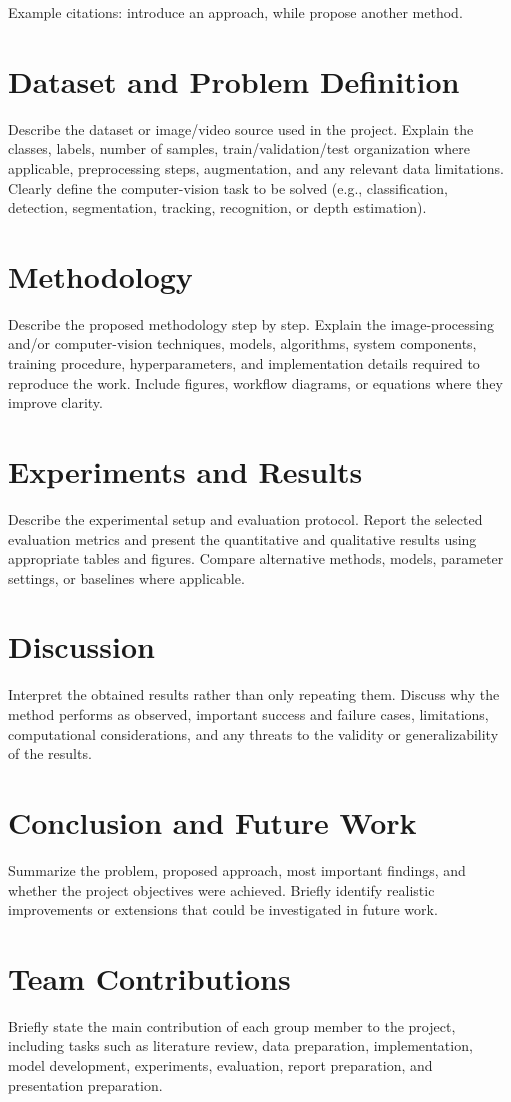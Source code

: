 \documentclass[14pt]{article}
\begin{document}
Example citations: \cite{corke2011robotics} introduce an approach, while \cite{mahonyKC12} propose another method.

\section{Dataset and Problem Definition}
Describe the dataset or image/video source used in the project. Explain the classes, labels, number of samples, train/validation/test organization where applicable, preprocessing steps, augmentation, and any relevant data limitations. Clearly define the computer-vision task to be solved (e.g., classification, detection, segmentation, tracking, recognition, or depth estimation).

\section{Methodology}
Describe the proposed methodology step by step. Explain the image-processing and/or computer-vision techniques, models, algorithms, system components, training procedure, hyperparameters, and implementation details required to reproduce the work. Include figures, workflow diagrams, or equations where they improve clarity.

\section{Experiments and Results}
Describe the experimental setup and evaluation protocol. Report the selected evaluation metrics and present the quantitative and qualitative results using appropriate tables and figures. Compare alternative methods, models, parameter settings, or baselines where applicable.

\section{Discussion}
Interpret the obtained results rather than only repeating them. Discuss why the method performs as observed, important success and failure cases, limitations, computational considerations, and any threats to the validity or generalizability of the results.

\section{Conclusion and Future Work}
Summarize the problem, proposed approach, most important findings, and whether the project objectives were achieved. Briefly identify realistic improvements or extensions that could be investigated in future work.

\section{Team Contributions}
Briefly state the main contribution of each group member to the project, including tasks such as literature review, data preparation, implementation, model development, experiments, evaluation, report preparation, and presentation preparation.



\end{document}
